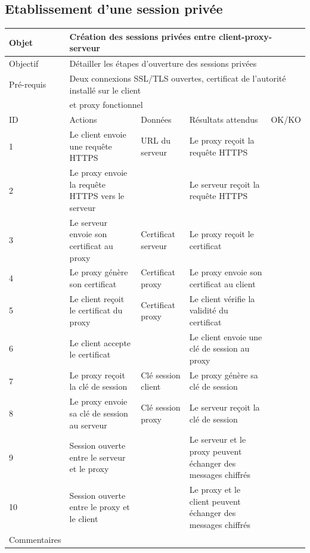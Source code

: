 \documentclass[a4paper,11pt,french]{article}
\begin{document}
\newpage

\subsection{Etablissement d'une session privée}

\begin{tabular}{|m{2.5cm}|m{4cm}|m{3cm}|m{3.5cm}|m{2cm}|}
\hline 
\rowcolor{Blue} Objet & \multicolumn{4}{|l|}{Création des sessions privées entre client-proxy-serveur} \\ 
\hline 
\rowcolor{Blue} Objectif & \multicolumn{4}{|l|}{Détailler les étapes d'ouverture des sessions privées} \\ 
\hline 
\rowcolor{Blue} Pré-requis & \multicolumn{4}{|l|}{Deux connexions SSL/TLS ouvertes, certificat de l'autorité installé sur le client} \\ 
\rowcolor{Blue} & \multicolumn{4}{|l|}{et proxy fonctionnel} \\
\hline
\rowcolor{Orange} ID & Actions & Données & Résultats attendus & OK/KO \\ 
\hline 
1 & Le client envoie une requête HTTPS & URL du serveur & Le proxy reçoit la requête HTTPS &  \\ 
\hline
2 & Le proxy envoie la requête HTTPS vers le serveur & & Le serveur reçoit la requête HTTPS & \\
\hline
3 & Le serveur envoie son certificat au proxy & Certificat serveur & Le proxy reçoit le certificat & \\
\hline 
4 & Le proxy génère son certificat & Certificat proxy & Le proxy envoie son certificat au client & \\
\hline
5 & Le client reçoit le certificat du proxy & Certificat proxy & Le client vérifie la 
validité du certificat & \\
\hline
6 & Le client accepte le certificat & & Le client envoie une clé de session au 
proxy & \\
\hline
7 & Le proxy reçoit la clé de session & Clé session client & Le proxy génère sa clé de session & \\
\hline
8 & Le proxy envoie sa clé de session au serveur & Clé session proxy & Le serveur 
reçoit la clé de session & \\
\hline
9 & Session ouverte entre le serveur et le proxy & & Le serveur et le proxy 
peuvent échanger des messages chiffrés & \\
\hline
10 & Session ouverte entre le proxy et le client & & Le proxy et le client 
peuvent échanger des messages chiffrés & \\
\hline
Commentaires & \multicolumn{4}{|l|}{} \\ 
\hline
\end{tabular}
\end{document}
